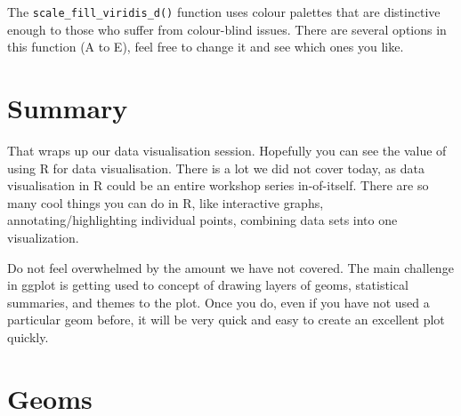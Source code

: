\documentclass[
]{book}
\begin{document}
The \texttt{scale\_fill\_viridis\_d()} function uses colour palettes that are distinctive enough to those who suffer from colour-blind issues. There are several options in this function (A to E), feel free to change it and see which ones you like.

\hypertarget{summary-9}{%
\section{Summary}\label{summary-9}}

That wraps up our data visualisation session. Hopefully you can see the value of using R for data visualisation. There is a lot we did not cover today, as data visualisation in R could be an entire workshop series in-of-itself. There are so many cool things you can do in R, like interactive graphs, annotating/highlighting individual points, combining data sets into one visualization.

Do not feel overwhelmed by the amount we have not covered. The main challenge in ggplot is getting used to concept of drawing layers of geoms, statistical summaries, and themes to the plot. Once you do, even if you have not used a particular geom before, it will be very quick and easy to create an excellent plot quickly.

\hypertarget{geoms}{%
\section{Geoms}\label{geoms}}
\end{document}
